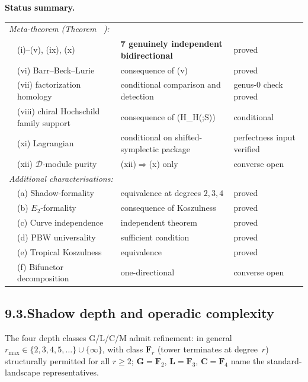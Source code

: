 \documentclass[11pt,reqno]{amsart}
\makeatletter
\theoremstyle{definition}
\theoremstyle{remark}
\providecommand{\cA}{\mathcal{A}}
\numberwithin{equation}{section}
\let\svy@oldref\ref
\renewcommand{\ref}[1]{%
 \@ifundefined{r@#1}{\textit{full monograph}}{\svy@oldref{#1}}%
}
\makeatother
\begin{document}
\medskip
\noindent\textbf{Status summary.}
\begin{center}
\renewcommand{\arraystretch}{1.15}
\begin{tabular}{clll}
\multicolumn{4}{l}{\emph{Meta-theorem (Theorem~\ref{thm:koszul-equivalences-meta}):}}\\[1pt]
& (i)--(v), (ix), (x) & \textbf{7 genuinely independent bidirectional} & proved\\
& (vi) Barr--Beck--Lurie & consequence of (v) & proved\\
& (vii) factorization homology & conditional comparison and detection & genus-$0$ check proved\\
& (viii) chiral Hochschild family support & consequence of (H_H(\cA;S)) & conditional\\
& (xi) Lagrangian & conditional on shifted-symplectic package & perfectness input verified\\
& (xii) $\mathcal D$-module purity & (xii)$\Rightarrow$(x) only & converse open\\[3pt]
\multicolumn{4}{l}{\emph{Additional characterisations:}}\\[1pt]
& (a) Shadow-formality & equivalence at degrees $2,3,4$ & proved\\
& (b) $E_2$-formality & consequence of Koszulness & proved\\
& (c) Curve independence & independent theorem & proved\\
& (d) PBW universality & sufficient condition & proved\\
& (e) Tropical Koszulness & equivalence & proved\\
& (f) Bifunctor decomposition & one-directional & converse open
\end{tabular}
\end{center}

\subsection*{9.3.\enspace Shadow depth and operadic complexity}

The four depth classes G/L/C/M admit refinement: in general
$r_{\max}\in\{2,3,4,5,\ldots\}\cup\{\infty\}$, with class $\mathbf F_r$
(tower terminates at degree~$r$) structurally permitted for all
$r\ge 2$; $\mathbf G=\mathbf F_2$, $\mathbf L=\mathbf F_3$,
$\mathbf C=\mathbf F_4$ name the standard-landscape representatives.
\end{document}
